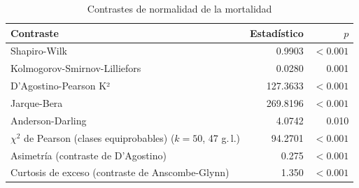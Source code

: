 \begin{table}[htbp]
\centering
\small
\caption{Contrastes de normalidad de la mortalidad}\label{tab:normalidad}
\begin{tabularx}{\linewidth}{>{\raggedright\arraybackslash}X r r}
\toprule
Contraste & Estadístico & $p$ \\
\midrule
Shapiro-Wilk & \num{0.9903} & $<\num{0.001}$ \\
Kolmogorov-Smirnov-Lilliefors & \num{0.0280} & \num{0.001} \\
D'Agostino-Pearson K² & \num{127.3633} & $<\num{0.001}$ \\
Jarque-Bera & \num{269.8196} & $<\num{0.001}$ \\
Anderson-Darling & \num{4.0742} & \num{0.010} \\
$\chi^2$ de Pearson (clases equiprobables) ($k = 50$, 47 g.\,l.) & \num{94.2701} & $<\num{0.001}$ \\
Asimetría (contraste de D'Agostino) & \num{0.275} & $<\num{0.001}$ \\
Curtosis de exceso (contraste de Anscombe-Glynn) & \num{1.350} & $<\num{0.001}$ \\
\bottomrule
\end{tabularx}
\par{}
\end{table}
